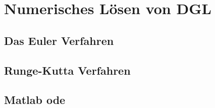 \section{Numerisches Lösen von DGL}
\subsection{Das Euler Verfahren}
\subsection{Runge-Kutta Verfahren}
\subsection{Matlab ode}
